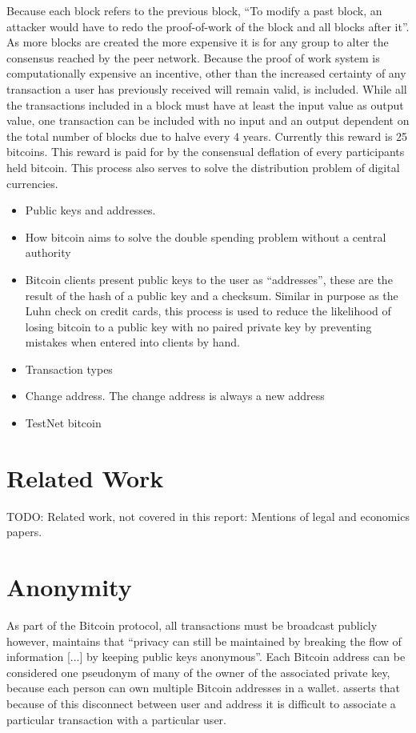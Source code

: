 Because each block refers to the previous block, ``To modify a past block, an
attacker would have to redo the proof-of-work of the block and all blocks after
it''.  As more blocks are created the more expensive it is for any group to
alter the consensus reached by the peer network.  Because the proof of work
system is computationally expensive an incentive, other than the increased
certainty of any transaction a user has previously received will remain valid,
is included.  While all the transactions included in a block must have at least
the input value as output value, one transaction can be included with no input
and an output dependent on the total number of blocks due to halve every 4
years. Currently this reward is 25 bitcoins. This reward is paid for by the
consensual deflation of every participants held bitcoin. This process also
serves to solve the distribution problem of digital currencies.

\begin{itemize} \item Public keys and addresses.  \item How bitcoin aims to
        solve the double spending problem without a central authority \item
            Bitcoin clients present public keys to the user as ``addresses'',
            these are the result of the hash of a public key and a checksum.
            Similar in purpose as the Luhn check on credit cards, this process
        is used to reduce the likelihood of losing bitcoin to a public key with
    no paired private key by preventing mistakes when entered into clients by
hand.  \item Transaction types \item Change address.  The change address is
always a new address \item TestNet bitcoin \end{itemize}

\section{Related Work}
TODO: Related work, not covered in this report: Mentions of legal and economics papers.

\section{Anonymity} As part of the Bitcoin protocol, all transactions must be
broadcast publicly however, \textcite{satoshi} maintains that ``privacy can still be
maintained by breaking the flow of information [...] by keeping public keys
anonymous''.  Each Bitcoin address can be considered one pseudonym of many of
the owner of the associated private key, because each person can own multiple
Bitcoin addresses in a wallet. \textcite{satoshi} asserts that because of this disconnect
between user and address it is difficult to associate a particular transaction
with a particular user.

